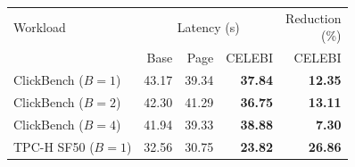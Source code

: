 {\footnotesize
\begin{tabular}{@{}lrrrr@{}}
\toprule
Workload & \multicolumn{3}{c}{Latency (s)} & \shortstack{Reduction\\(\%)} \\
\cmidrule(lr){2-4}
& Base & Page & CELEBI & CELEBI \\
\midrule
ClickBench ($B=1$) & 43.17 & 39.34 & \textbf{37.84} & \textbf{12.35} \\
ClickBench ($B=2$) & 42.30 & 41.29 & \textbf{36.75} & \textbf{13.11} \\
ClickBench ($B=4$) & 41.94 & 39.33 & \textbf{38.88} & \textbf{7.30} \\
\midrule
TPC-H SF50 ($B=1$) & 32.56 & 30.75 & \textbf{23.82} & \textbf{26.86} \\
\bottomrule
\end{tabular}
}
